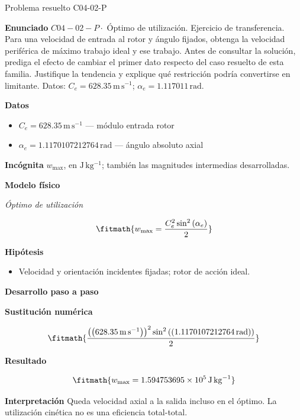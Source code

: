 \documentclass[10pt,openany]{book}
\begin{document}
\begin{studiumworked}{Problema resuelto C04-02-P}


\noindent\textbf{Enunciado}
\(C04-02-P \cdot\) Óptimo de utilización. Ejercicio de transferencia. Para una velocidad de entrada al rotor y ángulo fijados, obtenga la velocidad periférica de máximo trabajo ideal y ese trabajo. Antes de consultar la solución, prediga el efecto de cambiar el primer dato respecto del caso resuelto de esta familia. Justifique la tendencia y explique qué restricción podría convertirse en limitante. Datos: \(C_e=628.35\, \mathrm{m}\,\mathrm{s}^{-1}\); \(\alpha_e=1.117011\, \mathrm{rad}\).

\noindent\textbf{Datos}
\begin{itemize}
\item $C_e = 628.35\,\mathrm{m}\,\mathrm{s}^{-1}$ — módulo entrada rotor
\item $\alpha_e = 1.1170107212764\,\mathrm{rad}$ — ángulo absoluto axial
\end{itemize}

\noindent\textbf{Incógnita}
$w_{\max}$, en $\mathrm{J\,kg^{-1}}$; también las magnitudes intermedias desarrolladas.

\noindent\textbf{Modelo físico}

\noindent\textit{Óptimo de utilización}

\[
\fitmath{w_{\max}=\frac{C_e^{2} \sin^{2}{\left(\alpha_e \right)}}{2}}
\]

\noindent\textbf{Hipótesis}
\begin{itemize}
\item Velocidad y orientación incidentes fijadas; rotor de acción ideal.
\end{itemize}

\noindent\textbf{Desarrollo paso a paso}



\noindent\textbf{Sustitución numérica}

\[
\fitmath{\frac{\left(\left(628.35\,\mathrm{m}\,\mathrm{s}^{-1}\right)\right)^{2} \sin^{2}{\left(\left(1.1170107212764\,\mathrm{rad}\right) \right)}}{2}}
\]

\noindent\textbf{Resultado}

\[
\fitmath{w_{\max}=1.594753695\times10^{5}\,\mathrm{J}\,\mathrm{kg}^{-1}}
\]

\noindent\textbf{Interpretación}
Queda velocidad axial a la salida incluso en el óptimo. La utilización cinética no es una eficiencia total-total.


\end{studiumworked}
\end{document}
